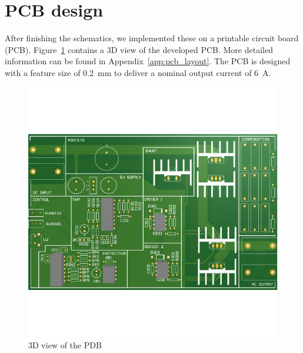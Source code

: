 \documentclass[11pt,titlepage]{report}
\begin{document}
\section{PCB design}
After finishing the schematics, we implemented these on a printable circuit board (PCB). Figure~\ref{fig:ass1-pcb-3d} contains a 3D view of the developed PCB. More detailed information can be found in Appendix~\ref{app:pcb_layout}. The PCB is designed with a feature size of \SI{0.2}{mm} to deliver a nominal output current of \SI{6}{A}.

\begin{figure}[H]
	\begin{center}
		\includegraphics[width=0.8\linewidth]{resource/pcb-3d-rc.pdf}
	\end{center}
	\caption{3D view of the PDB}
	\label{fig:ass1-pcb-3d}
\end{figure}
\end{document}
